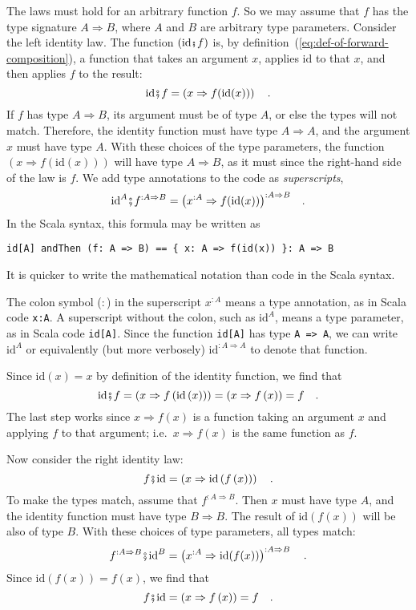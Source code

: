 The laws must hold for an arbitrary function $f$. So we may assume
that $f$ has the type signature $A\Rightarrow B$, where $A$ and
$B$ are arbitrary type parameters. Consider the left identity law.
The function $\left(\text{id}\bef f\right)$ is, by definition~(\ref{eq:def-of-forward-composition}),
a function that takes an argument $x$, applies $\text{id}$ to that
$x$, and then applies $f$ to the result: 
\[
\text{id}\bef f=\left(x\Rightarrow f(\text{id}(x))\right)\quad.
\]
If $f$ has type $A\Rightarrow B$, its argument must be of type $A$,
or else the types will not match. Therefore, the identity function
must have type $A\Rightarrow A$, and the argument $x$ must have
type $A$. With these choices of the type parameters, the function
$\left(x\Rightarrow f(\text{id}(x))\right)$ will have type $A\Rightarrow B$,
as it must since the right-hand side of the law is $f$. We add type
annotations to the code as \emph{superscripts},
\[
\text{id}^{A}\bef f^{:A\Rightarrow B}=\big(x^{:A}\Rightarrow f(\text{id}(x))\big)^{:A\Rightarrow B}\quad.
\]
In the Scala syntax, this formula may be written as
\begin{lstlisting}
id[A] andThen (f: A => B) == { x: A => f(id(x)) }: A => B
\end{lstlisting}
It is quicker to write the mathematical notation than code in the
Scala syntax. 

The colon symbol ($:$) in the superscript $x^{:A}$ means a type
annotation, as in Scala code \lstinline!x:A!. A superscript without
the colon, such as $\text{id}^{A}$, means a type parameter, as in
Scala code \lstinline!id[A]!. Since the function \lstinline!id[A]!
has type \lstinline!A => A!, we can write $\text{id}^{A}$ or equivalently
(but more verbosely) $\text{id}^{:A\Rightarrow A}$ to denote that
function.

Since $\text{id}(x)=x$ by definition of the identity function, we
find that 
\[
\text{id}\bef f=\left(x\Rightarrow f\left(\text{id}\left(x\right)\right)\right)=\left(x\Rightarrow f\left(x\right)\right)=f\quad.
\]
The last step works since $x\Rightarrow f\left(x\right)$ is a function
taking an argument $x$ and applying $f$ to that argument; i.e.~$x\Rightarrow f\left(x\right)$
is the same function as $f$.

Now consider the right identity law:
\[
f\bef\text{id}=\left(x\Rightarrow\text{id}\left(f\left(x\right)\right)\right)\quad.
\]
To make the types match, assume that $f^{:A\Rightarrow B}$. Then
$x$ must have type $A$, and the identity function must have type
$B\Rightarrow B$. The result of $\text{id}\left(f\left(x\right)\right)$
will be also of type $B$. With these choices of type parameters,
all types match:
\[
f^{:A\Rightarrow B}\bef\text{id}^{B}=\left(x^{:A}\Rightarrow\text{id}(f(x))\right)^{:A\Rightarrow B}\quad.
\]
Since $\text{id}(f(x))=f(x)$, we find that 
\[
f\bef\text{id}=\left(x\Rightarrow f\left(x\right)\right)=f\quad.
\]

